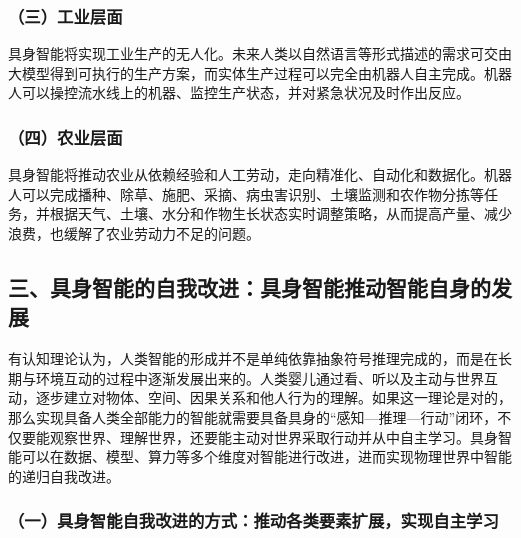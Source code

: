 \hypertarget{ux4e09ux5de5ux4e1aux5c42ux9762}{%
\subsubsection{（三）工业层面}\label{ux4e09ux5de5ux4e1aux5c42ux9762}}

具身智能将实现工业生产的无人化。未来人类以自然语言等形式描述的需求可交由大模型得到可执行的生产方案，而实体生产过程可以完全由机器人自主完成。机器人可以操控流水线上的机器、监控生产状态，并对紧急状况及时作出反应。

\hypertarget{ux56dbux519cux4e1aux5c42ux9762}{%
\subsubsection{（四）农业层面}\label{ux56dbux519cux4e1aux5c42ux9762}}

具身智能将推动农业从依赖经验和人工劳动，走向精准化、自动化和数据化。机器人可以完成播种、除草、施肥、采摘、病虫害识别、土壤监测和农作物分拣等任务，并根据天气、土壤、水分和作物生长状态实时调整策略，从而提高产量、减少浪费，也缓解了农业劳动力不足的问题。

\hypertarget{ux4e09ux5177ux8eabux667aux80fdux7684ux81eaux6211ux6539ux8fdbux5177ux8eabux667aux80fdux63a8ux52a8ux667aux80fdux81eaux8eabux7684ux53d1ux5c55}{%
\subsection{三、具身智能的自我改进：具身智能推动智能自身的发展}\label{ux4e09ux5177ux8eabux667aux80fdux7684ux81eaux6211ux6539ux8fdbux5177ux8eabux667aux80fdux63a8ux52a8ux667aux80fdux81eaux8eabux7684ux53d1ux5c55}}

有认知理论认为，人类智能的形成并不是单纯依靠抽象符号推理完成的，而是在长期与环境互动的过程中逐渐发展出来的。人类婴儿通过看、听以及主动与世界互动，逐步建立对物体、空间、因果关系和他人行为的理解。如果这一理论是对的，那么实现具备人类全部能力的智能就需要具备具身的``感知---推理---行动''闭环，不仅要能观察世界、理解世界，还要能主动对世界采取行动并从中自主学习。具身智能可以在数据、模型、算力等多个维度对智能进行改进，进而实现物理世界中智能的递归自我改进。

\hypertarget{ux4e00ux5177ux8eabux667aux80fdux81eaux6211ux6539ux8fdbux7684ux65b9ux5f0fux63a8ux52a8ux5404ux7c7bux8981ux7d20ux6269ux5c55ux5b9eux73b0ux81eaux4e3bux5b66ux4e60}{%
\subsubsection{（一）具身智能自我改进的方式：推动各类要素扩展，实现自主学习}\label{ux4e00ux5177ux8eabux667aux80fdux81eaux6211ux6539ux8fdbux7684ux65b9ux5f0fux63a8ux52a8ux5404ux7c7bux8981ux7d20ux6269ux5c55ux5b9eux73b0ux81eaux4e3bux5b66ux4e60}}

